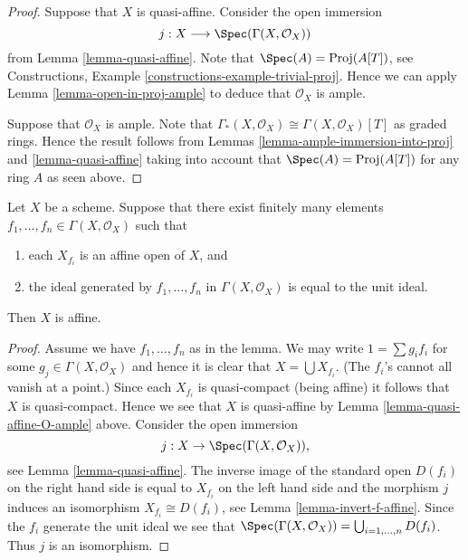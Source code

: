 \begin{proof}
Suppose that $X$ is quasi-affine. Consider the open immersion
$$
j : X \longrightarrow \Spec(\Gamma(X, \mathcal{O}_X))
$$
from Lemma \ref{lemma-quasi-affine}. Note that
$\Spec(A) = \text{Proj}(A[T])$, see
Constructions, Example \ref{constructions-example-trivial-proj}.
Hence we can apply Lemma \ref{lemma-open-in-proj-ample}
to deduce that $\mathcal{O}_X$ is ample.

\medskip\noindent
Suppose that $\mathcal{O}_X$ is ample.
Note that $\Gamma_*(X, \mathcal{O}_X) \cong \Gamma(X, \mathcal{O}_X)[T]$
as graded rings. Hence the result follows from Lemmas
\ref{lemma-ample-immersion-into-proj} and \ref{lemma-quasi-affine}
taking into account that
$\Spec(A) = \text{Proj}(A[T])$ for any ring $A$
as seen above.
\end{proof}

\begin{lemma}
\label{lemma-characterize-affine}
Let $X$ be a scheme. Suppose that there exist finitely many elements
$f_1, \ldots, f_n \in \Gamma(X, \mathcal{O}_X)$ such that
\begin{enumerate}
\item each $X_{f_i}$ is an affine open of $X$, and
\item the ideal generated by $f_1, \ldots, f_n$ in
$\Gamma(X, \mathcal{O}_X)$ is equal to the unit ideal.
\end{enumerate}
Then $X$ is affine.
\end{lemma}

\begin{proof}
Assume we have $f_1, \ldots, f_n$ as in the lemma.
We may write $1 = \sum g_i f_i$ for some $g_j \in \Gamma(X, \mathcal{O}_X)$
and hence it is clear that $X = \bigcup X_{f_i}$. (The $f_i$'s cannot
all vanish at a point.) Since each $X_{f_i}$
is quasi-compact (being affine) it follows that $X$ is quasi-compact.
Hence we see that $X$ is quasi-affine by
Lemma \ref{lemma-quasi-affine-O-ample} above.
Consider the open immersion
$$
j : X \to \Spec(\Gamma(X, \mathcal{O}_X)),
$$
see Lemma \ref{lemma-quasi-affine}. The inverse image of the standard open
$D(f_i)$ on the right hand side is equal to $X_{f_i}$ on the
left hand side and the morphism $j$ induces an isomorphism
$X_{f_i} \cong D(f_i)$, see
Lemma \ref{lemma-invert-f-affine}. Since the $f_i$ generate the unit ideal
we see that $\Spec(\Gamma(X, \mathcal{O}_X))
= \bigcup_{i = 1, \ldots, n} D(f_i)$. Thus $j$ is an isomorphism.
\end{proof}







